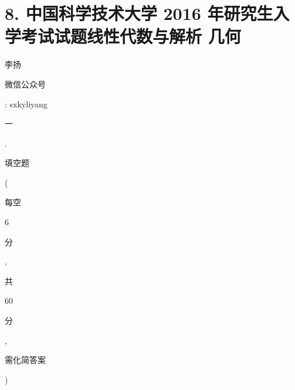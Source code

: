 \documentclass[10pt]{article}
\begin{document}
\section{8. 中国科学技术大学 2016 年研究生入学考试试题线性代数与解析 几何}
\begin{CJK}{UTF8}{mj}李扬\end{CJK}

\begin{CJK}{UTF8}{mj}微信公众号\end{CJK}: sxkyliyang

\begin{CJK}{UTF8}{mj}一\end{CJK}. \begin{CJK}{UTF8}{mj}填空题\end{CJK}(\begin{CJK}{UTF8}{mj}每空\end{CJK} 6 \begin{CJK}{UTF8}{mj}分\end{CJK}, \begin{CJK}{UTF8}{mj}共\end{CJK} 60 \begin{CJK}{UTF8}{mj}分\end{CJK}, \begin{CJK}{UTF8}{mj}需化简答案\end{CJK})
\end{document}

